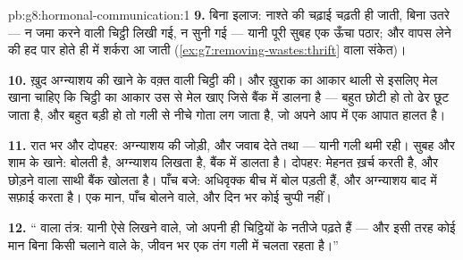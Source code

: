\begin{solution}{pb:g8:hormonal-communication:1}
\textbf{9.} बिना इलाज: नाश्ते की चढ़ाई चढ़ती ही जाती, बिना उतरे --- न
जमा करने वाली चिट्ठी लिखी गई, न सुनी गई --- यानी पूरी सुबह एक ऊँचा
पठार; और वापस लेने की हद पार होते ही  में शर्करा आ जाती
(\cref{ex:g7:removing-wastes:thrift} वाला संकेत)।

\textbf{10.} ख़ुद अग्न्याशय की खाने के वक़्त वाली चिट्ठी की। और ख़ुराक
का आकार थाली से इसलिए मेल खाना चाहिए कि चिट्ठी का आकार उस  से
मेल खाए जिसे बैंक में डालना है --- बहुत छोटी हो तो ढेर छूट जाता है, और
बहुत बड़ी हो तो गली से नीचे गोता लग जाता है, जो अपने आप में एक आपात
हालत है।

\textbf{11.} रात भर और दोपहर: अग्न्याशय की जोड़ी, और जवाब देते  तथा
 --- यानी गली थमी रही। सुबह और शाम के खाने:  बोलती है,
अग्न्याशय लिखता है,  बैंक में डालता है। दोपहर: मेहनत ख़र्च करती है,
और छोड़ने वाला साथी बैंक खोलता है। पाँच बजे: अधिवृक्क बीच में बोल पड़ती
हैं, और अग्न्याशय बाद में सफ़ाई करता है। एक मान, पाँच बोलने वाले, और
दिन भर कोई चुप्पी नहीं।

\textbf{12.} `` वाला तंत्र: यानी ऐसे लिखने वाले, जो अपनी ही
चिट्ठियों के नतीजे पढ़ते हैं --- और इसी तरह कोई मान बिना किसी चलाने वाले
के, जीवन भर एक तंग गली में चलता रहता है।''
\end{solution}
